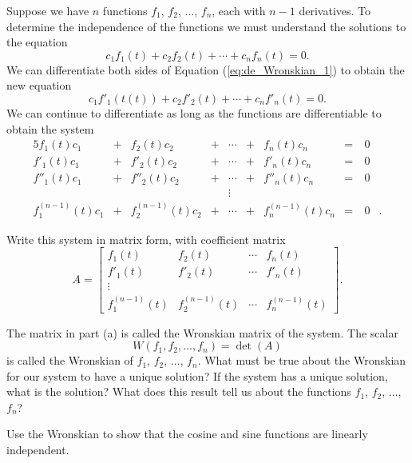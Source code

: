 \begin{pactivity} \label{act:de_Wronskian} Suppose we have $n$ functions $f_1$, $f_2$, $\ldots$, $f_n$, each with $n-1$ derivatives. To determine the independence of the functions we must understand the solutions to the equation
\begin{equation} \label{eq:de_Wronskian_1}
c_1 f_1(t) + c_2f_2(t) + \cdots + c_nf_n(t) = 0.
\end{equation}
We can differentiate both sides of Equation (\ref{eq:de_Wronskian_1}) to obtain the new equation
\[c_1 f'_1(t(t)) + c_2f'_2(t) + \cdots + c_nf'_n(t) = 0.\] 
We can continue to differentiate as long as the functions are differentiable to obtain the system
\begin{alignat*}{5}
{f_1(t)}c_1 				&{}+{}	&{f_2(t)}c_2				&{}+{}	&\cdots &{}+{} &{f_n(t)}c_n				&= &\ 0&{} \\
{f'_1(t)}c_1 				&{}+{}	&{f'_2(t)}c_2				&{}+{}	&\cdots &{}+{} &{f'_n(t)}c_n				&= &\ 0&{} \\
{f''_1(t)}c_1 				&{}+{}	&{f''_2(t)}c_2				&{}+{}	&\cdots &{}+{} &{f''_n(t)}c_n				&= &\ 0&{} \\
{}				 		&{}		&						&		&\vdots &		  &						& &&{} \\
{f^{(n-1)}_1(t)}c_1 	&{}+{}	&{f^{(n-1)}_2(t)}c_2	&{}+{}	&\cdots &{}+{} &{f^{(n-1)}_n(t)}c_n	&= &\ 0&{.}
\end{alignat*} 

	\ba
	\item Write this system in matrix form, with coefficient matrix
	\[A  = \left[ \begin{array}{ccccc} 
f_1(t) &f_2(t)& \cdots &f_n(t) \\
f'_1(t) &f'_2(t)& \cdots &f'_n(t) \\
\vdots &			&			& \\
f^{(n-1)}_1(t) &f^{(n-1)}_2(t)& \cdots &f^{(n-1)}_n(t) 
\end{array} \right] .\]

	\item The matrix in part (a) is called the Wronskian matrix of the system. The scalar 
	\[W(f_1, f_2, \ldots, f_n) = \det(A)\]
is called the Wronskian of $f_1$, $f_2$, $\ldots$, $f_n$. What must be true about the Wronskian for our system to have a unique solution? If the system has a unique solution, what is the solution? What does this result tell us about the functions $f_1$, $f_2$, $\ldots$, $f_n$? 
	

		\item Use the Wronskian to show that the cosine and sine functions are linearly independent.
	
\ea

\end{pactivity}

